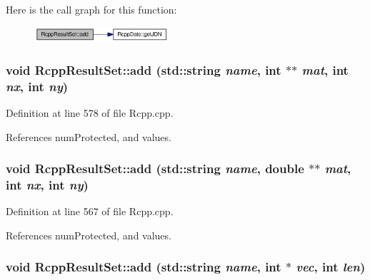 Here is the call graph for this function:\nopagebreak
\begin{figure}[H]
\begin{center}
\leavevmode
\includegraphics[width=141pt]{classRcppResultSet_e5cb861a0d6e95cc7ed465ccae2ac4a7_cgraph}
\end{center}
\end{figure}
\hypertarget{classRcppResultSet_2cca9ea4e9554c4fad9bc326355c354c}{
\subsubsection[{add}]{\setlength{\rightskip}{0pt plus 5cm}void RcppResultSet::add (std::string {\em name}, \/  int $\ast$$\ast$ {\em mat}, \/  int {\em nx}, \/  int {\em ny})}}
\label{classRcppResultSet_2cca9ea4e9554c4fad9bc326355c354c}




Definition at line 578 of file Rcpp.cpp.

References numProtected, and values.\hypertarget{classRcppResultSet_88ff0e3db486eec0012eb58beee05e9b}{
\subsubsection[{add}]{\setlength{\rightskip}{0pt plus 5cm}void RcppResultSet::add (std::string {\em name}, \/  double $\ast$$\ast$ {\em mat}, \/  int {\em nx}, \/  int {\em ny})}}
\label{classRcppResultSet_88ff0e3db486eec0012eb58beee05e9b}




Definition at line 567 of file Rcpp.cpp.

References numProtected, and values.\hypertarget{classRcppResultSet_494dbe1f6db48bf48e9e33a32d897f29}{
\subsubsection[{add}]{\setlength{\rightskip}{0pt plus 5cm}void RcppResultSet::add (std::string {\em name}, \/  int $\ast$ {\em vec}, \/  int {\em len})}}
\label{classRcppResultSet_494dbe1f6db48bf48e9e33a32d897f29}




